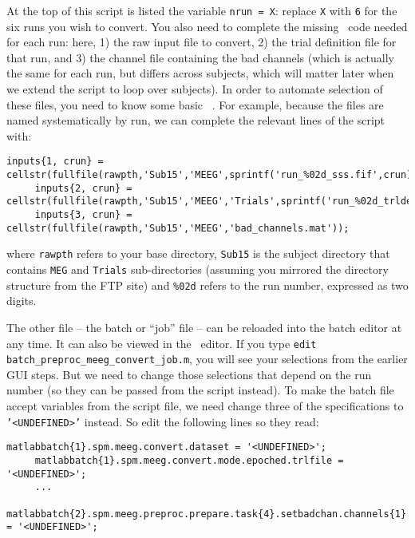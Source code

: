 At the top of this script is listed the variable \verb|nrun = X|: replace \verb|X| with \verb|6| for the six runs you wish to convert. You also need to complete the missing \matlab\ code needed for each run: here, 1) the raw input file to convert, 2) the trial definition file for that run, and 3) the channel file containing the bad channels (which is actually the same for each run, but differs across subjects, which will matter later when we extend the script to loop over subjects). In order to automate selection of these files, you need to know some basic \matlab\ . For example, because the files are named systematically by run, we can complete the relevant lines of the script with:

\begin{lstlisting}[style=Matlab-editor,basicstyle=\mlttfamily\footnotesize]
     inputs{1, crun} = cellstr(fullfile(rawpth,'Sub15','MEEG',sprintf('run_%02d_sss.fif',crun)));
     inputs{2, crun} = cellstr(fullfile(rawpth,'Sub15','MEEG','Trials',sprintf('run_%02d_trldef.mat',crun)));
     inputs{3, crun} = cellstr(fullfile(rawpth,'Sub15','MEEG','bad_channels.mat'));
\end{lstlisting}

where \verb|rawpth| refers to your base directory, \verb|Sub15| is the subject directory that contains \texttt{MEG} and \texttt{Trials} sub-directories (assuming you mirrored the directory structure from the FTP site) and \texttt{\%02d} refers to the run number, expressed as two digits.

The other file -- the batch or ``job'' file -- can be reloaded into the batch editor at any time. It can also be viewed in the \matlab\ editor. If you type \texttt{edit batch\_preproc\_meeg\_convert\_job.m}, you will see your selections from the earlier GUI steps. But we need to change those selections that depend on the run number (so they can be passed from the script instead). To make the batch file accept variables from the script file, we need change three of the specifications to \texttt{'<UNDEFINED>'} instead. So edit the following lines so they read:

\begin{lstlisting}[style=Matlab-editor,basicstyle=\mlttfamily\footnotesize]
     matlabbatch{1}.spm.meeg.convert.dataset = '<UNDEFINED>';
     matlabbatch{1}.spm.meeg.convert.mode.epoched.trlfile = '<UNDEFINED>';
     ...
     matlabbatch{2}.spm.meeg.preproc.prepare.task{4}.setbadchan.channels{1}.chanfile = '<UNDEFINED>';
\end{lstlisting}

